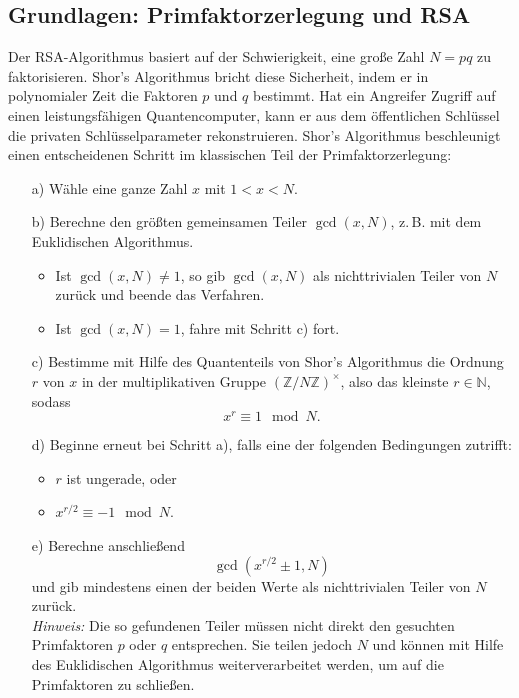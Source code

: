 {\subsection{Grundlagen: Primfaktorzerlegung und RSA}
Der RSA-Algorithmus basiert auf der Schwierigkeit, eine große Zahl \( N = pq \) zu faktorisieren. Shor’s Algorithmus bricht diese Sicherheit, indem er in polynomialer Zeit die Faktoren \( p \) und \( q \) bestimmt. Hat ein Angreifer Zugriff auf einen leistungsfähigen Quantencomputer, kann er aus dem öffentlichen Schlüssel die privaten Schlüsselparameter rekonstruieren. Shor's Algorithmus beschleunigt einen entscheidenen Schritt im klassischen Teil der Primfaktorzerlegung:

\begin{itemize}
  \item[a)] Wähle eine ganze Zahl \(x\) mit \(1 < x < N\).
  
  \item[b)] Berechne den größten gemeinsamen Teiler \(\gcd(x, N)\), z.\,B. mit dem Euklidischen Algorithmus.  
  \begin{itemize}
    \item Ist \(\gcd(x, N) \ne 1\), so gib \(\gcd(x, N)\) als nichttrivialen Teiler von \(N\) zurück und beende das Verfahren.
    \item Ist \(\gcd(x, N) = 1\), fahre mit Schritt c) fort.
  \end{itemize}
  
  \item[c)] Bestimme mit Hilfe des Quantenteils von Shor's Algorithmus die Ordnung \(r\) von \(x\) in der multiplikativen Gruppe \((\mathbb{Z}/N\mathbb{Z})^\times\), also das kleinste \(r \in \mathbb{N}\), sodass
  \[
  x^r \equiv 1 \mod N.
  \]
  
  \item[d)] Beginne erneut bei Schritt a), falls eine der folgenden Bedingungen zutrifft:
  \begin{itemize}
    \item \(r\) ist ungerade, oder
    \item \(x^{r/2} \equiv -1 \mod N\).
  \end{itemize}
  
  \item[e)] Berechne anschließend
  \[
  \gcd(x^{r/2} \pm 1, N)
  \]
  und gib mindestens einen der beiden Werte als nichttrivialen Teiler von \(N\) zurück.\\
  \[
  \]
  \textit{Hinweis:} Die so gefundenen Teiler müssen nicht direkt den gesuchten Primfaktoren \(p\) oder \(q\) entsprechen. Sie teilen jedoch \(N\) und können mit Hilfe des Euklidischen Algorithmus weiterverarbeitet werden, um auf die Primfaktoren zu schließen.
\end{itemize}


}
